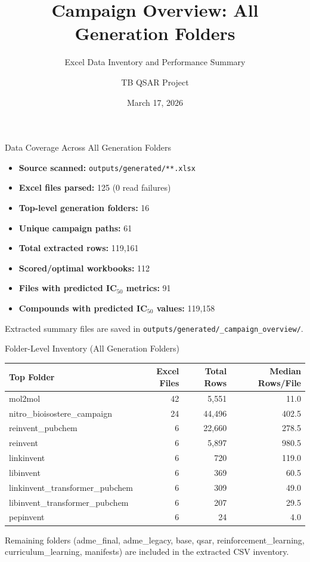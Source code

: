 \documentclass[aspectratio=169]{beamer}
\title[Campaign Overview]{Campaign Overview: All Generation Folders}
\subtitle{Excel Data Inventory and Performance Summary}
\author{TB QSAR Project}
\date{March 17, 2026}
\begin{document}
\begin{frame}
  \titlepage
\end{frame}

\begin{frame}{Data Coverage Across All Generation Folders}
  \small
  \begin{itemize}
    \item \textbf{Source scanned:} \texttt{outputs/generated/**.xlsx}
    \item \textbf{Excel files parsed:} 125 (0 read failures)
    \item \textbf{Top-level generation folders:} 16
    \item \textbf{Unique campaign paths:} 61
    \item \textbf{Total extracted rows:} 119,161
    \item \textbf{Scored/optimal workbooks:} 112
    \item \textbf{Files with predicted IC$_{50}$ metrics:} 91
    \item \textbf{Compounds with predicted IC$_{50}$ values:} 119,158
  \end{itemize}

  \vspace{0.6em}
  {\footnotesize
  Extracted summary files are saved in \texttt{outputs/generated/\_campaign\_overview/}.}
\end{frame}

\begin{frame}{Folder-Level Inventory (All Generation Folders)}
  \scriptsize
  \centering
  \begin{tabular}{lrrr}
    \toprule
    \textbf{Top Folder} & \textbf{Excel Files} & \textbf{Total Rows} & \textbf{Median Rows/File} \\
    \midrule
    mol2mol & 42 & 5,551 & 11.0 \\
    nitro\_bioisostere\_campaign & 24 & 44,496 & 402.5 \\
    reinvent\_pubchem & 6 & 22,660 & 278.5 \\
    reinvent & 6 & 5,897 & 980.5 \\
    linkinvent & 6 & 720 & 119.0 \\
    libinvent & 6 & 369 & 60.5 \\
    linkinvent\_transformer\_pubchem & 6 & 309 & 49.0 \\
    libinvent\_transformer\_pubchem & 6 & 207 & 29.5 \\
    pepinvent & 6 & 24 & 4.0 \\
    \bottomrule
  \end{tabular}

  \vspace{0.5em}
  {\footnotesize Remaining folders (adme\_final, adme\_legacy, base, qsar, reinforcement\_learning, curriculum\_learning, manifests) are included in the extracted CSV inventory.}
\end{frame}
\end{document}
